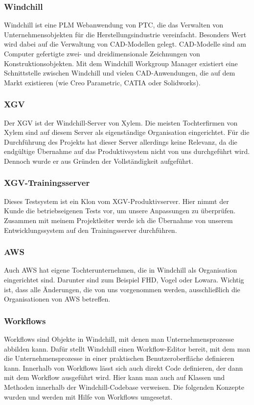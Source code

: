 \subsubsection{Windchill}
Windchill ist eine \ac{PLM} Webanwendung von PTC, die das Verwalten von Unternehmensobjekten für die Herstellungsindustrie vereinfacht.
Besonders Wert wird dabei auf die Verwaltung von CAD-Modellen gelegt.
CAD-Modelle sind am Computer gefertigte zwei- und dreidimensionale Zeichnungen von Konstruktionsobjekten.
Mit dem Windchill Workgroup Manager existiert eine Schnittstelle zwischen Windchill und vielen CAD-Anwendungen, die auf dem Markt existieren (wie \zB Creo Parametric, CATIA oder Solidworks).

\subsubsection{\acs{XGV}}
Der \acl{XGV} ist der Windchill-Server von Xylem.
Die meisten Tochterfirmen von Xylem sind auf diesem Server als eigenständige Organisation eingerichtet.
Für die Durchführung des Projekts hat dieser Server allerdings keine Relevanz, da die endgültige Übernahme auf das Produktivsystem nicht von uns durchgeführt wird.
Dennoch wurde er aus Gründen der Vollständigkeit aufgeführt.

\subsubsection{\ac{XGV}-Trainingsserver}
Dieses Testsystem ist ein Klon vom \ac{XGV}-Produktivserver.
Hier nimmt der Kunde die betriebseigenen Tests vor, um unsere Anpassungen zu überprüfen.
Zusammen mit meinem Projektleiter werde ich die Übernahme von unserem Entwicklungssystem auf den Trainingsserver durchführen.

\subsubsection{\acs{AWS}}
Auch \ac{AWS} hat eigene Tochterunternehmen, die in Windchill als Organisation eingerichtet sind.
Darunter sind zum Beispiel FHD, Vogel oder Lowara.
Wichtig ist, dass alle Änderungen, die von uns vorgenommen werden, ausschließlich die Organisationen von \ac{AWS} betreffen.

\subsubsection{Workflows}
Workflows sind Objekte in Windchill, mit denen man Unternehmensprozesse abbilden kann.
Dafür stellt Windchill einen Workflow-Editor bereit, mit dem man die Unternehmensprozesse in einer praktischen Benutzeroberfläche definieren kann.
Innerhalb von Workflows lässt sich auch direkt Code definieren, der dann mit dem Workflow ausgeführt wird.
Hier kann man auch auf Klassen und Methoden innerhalb der Windchill-Codebase verweisen.
Die folgenden Konzepte wurden und werden mit Hilfe von Workflows umgesetzt.

